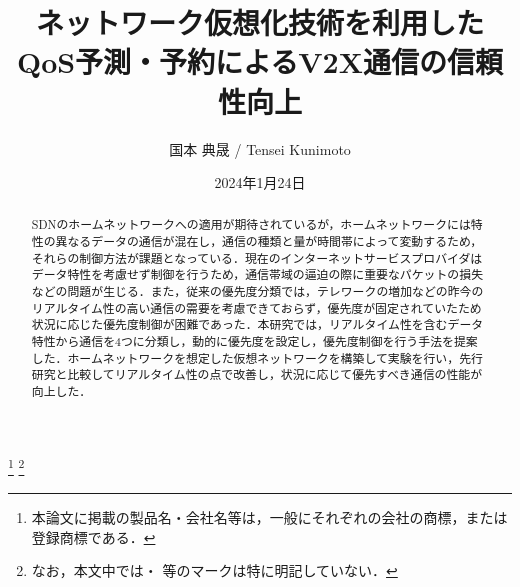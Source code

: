 \documentclass[a4paper,11pt,uplatex]{ujreport}
\title{ネットワーク仮想化技術を利用した\\QoS予測・予約によるV2X通信の信頼性向上}  %
\author{国本 典晟 / Tensei Kunimoto}  %
\date{2024年1月24日}  %
\begin{document}
\maketitle
\clearpage

\begin{abstract}
  SDNのホームネットワークへの適用が期待されているが，ホームネットワークには特性の異なるデータの通信が混在し，通信の種類と量が時間帯によって変動するため，それらの制御方法が課題となっている．現在のインターネットサービスプロバイダはデータ特性を考慮せず制御を行うため，通信帯域の逼迫の際に重要なパケットの損失などの問題が生じる．また，従来の優先度分類では，テレワークの増加などの昨今のリアルタイム性の高い通信の需要を考慮できておらず，優先度が固定されていたため状況に応じた優先度制御が困難であった．本研究では，リアルタイム性を含むデータ特性から通信を4つに分類し，動的に優先度を設定し，優先度制御を行う手法を提案した．ホームネットワークを想定した仮想ネットワークを構築して実験を行い，先行研究と比較してリアルタイム性の点で改善し，状況に応じて優先すべき通信の性能が向上した．

\end{abstract}


\footnote[0]{本論文に掲載の製品名・会社名等は，一般にそれぞれの会社の商標，または登録商標である．}
\footnote[0]{なお，本文中では\texttrademark ・ \textregistered 等のマークは特に明記していない．}

\end{document}
